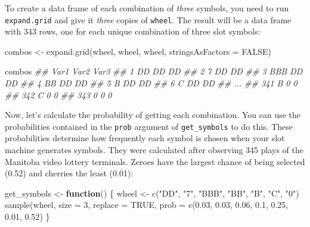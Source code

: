 \documentclass[
  letterpaper,
  DIV=11,
  numbers=noendperiod]{scrbook}
\newenvironment{Shaded}{\begin{snugshade}}{\end{snugshade}}
\newcommand{\AttributeTok}[1]{\textcolor[rgb]{0.40,0.45,0.13}{#1}}
\newcommand{\ConstantTok}[1]{\textcolor[rgb]{0.56,0.35,0.01}{#1}}
\newcommand{\ControlFlowTok}[1]{\textcolor[rgb]{0.00,0.23,0.31}{\textbf{#1}}}
\newcommand{\DecValTok}[1]{\textcolor[rgb]{0.68,0.00,0.00}{#1}}
\newcommand{\DocumentationTok}[1]{\textcolor[rgb]{0.37,0.37,0.37}{\textit{#1}}}
\newcommand{\ErrorTok}[1]{\textcolor[rgb]{0.68,0.00,0.00}{#1}}
\newcommand{\FloatTok}[1]{\textcolor[rgb]{0.68,0.00,0.00}{#1}}
\newcommand{\FunctionTok}[1]{\textcolor[rgb]{0.28,0.35,0.67}{#1}}
\newcommand{\NormalTok}[1]{\textcolor[rgb]{0.00,0.23,0.31}{#1}}
\newcommand{\OtherTok}[1]{\textcolor[rgb]{0.00,0.23,0.31}{#1}}
\newcommand{\StringTok}[1]{\textcolor[rgb]{0.13,0.47,0.30}{#1}}
\begin{document}
To create a data frame of each combination of \emph{three} symbols, you
need to run \texttt{expand.grid} and give it \emph{three} copies of
\texttt{wheel}. The result will be a data frame with 343 rows, one for
each unique combination of three slot symbols:

\begin{Shaded}
\begin{Highlighting}[]
\NormalTok{combos }\OtherTok{\textless{}{-}} \FunctionTok{expand.grid}\NormalTok{(wheel, wheel, wheel, }\AttributeTok{stringsAsFactors =} \ConstantTok{FALSE}\NormalTok{)}

\NormalTok{combos}
\DocumentationTok{\#\#   Var1 Var2 Var3}
\DocumentationTok{\#\# 1   DD   DD   DD}
\DocumentationTok{\#\# 2    7   DD   DD}
\DocumentationTok{\#\# 3  BBB   DD   DD}
\DocumentationTok{\#\# 4   BB   DD   DD}
\DocumentationTok{\#\# 5    B   DD   DD}
\DocumentationTok{\#\# 6    C   DD   DD}
\DocumentationTok{\#\# ...}
\DocumentationTok{\#\# 341    B    0    0}
\DocumentationTok{\#\# 342    C    0    0}
\DocumentationTok{\#\# 343    0    0    0}
\end{Highlighting}
\end{Shaded}

Now, let's calculate the probability of getting each combination. You
can use the probabilities contained in the \texttt{prob} argument of
\texttt{get\_symbols} to do this. These probabilities determine how
frequently each symbol is chosen when your slot machine generates
symbols. They were calculated after observing 345 plays of the Manitoba
video lottery terminals. Zeroes have the largest chance of being
selected (0.52) and cherries the least (0.01):

\begin{Shaded}
\begin{Highlighting}[]
\NormalTok{get\_symbols }\OtherTok{\textless{}{-}} \ControlFlowTok{function}\NormalTok{() \{}
\NormalTok{  wheel }\OtherTok{\textless{}{-}} \FunctionTok{c}\NormalTok{(}\StringTok{"DD"}\NormalTok{, }\StringTok{"7"}\NormalTok{, }\StringTok{"BBB"}\NormalTok{, }\StringTok{"BB"}\NormalTok{, }\StringTok{"B"}\NormalTok{, }\StringTok{"C"}\NormalTok{, }\StringTok{"0"}\NormalTok{)}
  \FunctionTok{sample}\NormalTok{(wheel, }\AttributeTok{size =} \DecValTok{3}\NormalTok{, }\AttributeTok{replace =} \ConstantTok{TRUE}\NormalTok{, }
    \AttributeTok{prob =} \FunctionTok{c}\NormalTok{(}\FloatTok{0.03}\NormalTok{, }\FloatTok{0.03}\NormalTok{, }\FloatTok{0.06}\NormalTok{, }\FloatTok{0.1}\NormalTok{, }\FloatTok{0.25}\NormalTok{, }\FloatTok{0.01}\NormalTok{, }\FloatTok{0.52}\NormalTok{)}
\ErrorTok{\}}
\end{Highlighting}
\end{Shaded}
\end{document}
